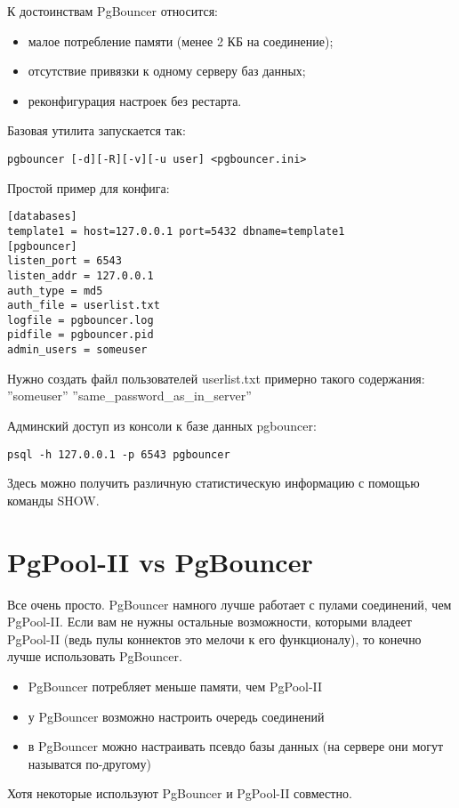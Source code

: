 К достоинствам PgBouncer относится:
\begin{itemize}
\item малое потребление памяти (менее 2 КБ на соединение);
\item отсутствие привязки к одному серверу баз данных;
\item реконфигурация настроек без рестарта.
\end{itemize}

Базовая утилита запускается так:
\begin{lstlisting}[label=lst:pgbouncer1,caption=PgBouncer]
pgbouncer [-d][-R][-v][-u user] <pgbouncer.ini>
\end{lstlisting}

Простой пример для конфига:
\begin{lstlisting}[label=lst:pgbouncer2,caption=PgBouncer]
[databases]
template1 = host=127.0.0.1 port=5432 dbname=template1
[pgbouncer]
listen_port = 6543
listen_addr = 127.0.0.1
auth_type = md5
auth_file = userlist.txt
logfile = pgbouncer.log
pidfile = pgbouncer.pid
admin_users = someuser
\end{lstlisting}

Нужно создать файл пользователей userlist.txt примерно такого содержания: ''someuser'' ''same\_password\_as\_in\_server''

Админский доступ из консоли к базе данных pgbouncer:
\begin{lstlisting}[label=lst:pgbouncer3,caption=PgBouncer]
psql -h 127.0.0.1 -p 6543 pgbouncer
\end{lstlisting}

Здесь можно получить различную статистическую информацию с помощью команды SHOW.

\section{PgPool-II vs PgBouncer}

Все очень просто. PgBouncer намного лучше работает с пулами соединений, чем PgPool-II. Если вам не
нужны остальные возможности, которыми владеет PgPool-II (ведь пулы коннектов это мелочи к его функционалу),
то конечно лучше использовать PgBouncer.
\begin{itemize}
\item PgBouncer потребляет меньше памяти, чем PgPool-II
\item у PgBouncer возможно настроить очередь соединений
\item в PgBouncer можно настраивать псевдо базы данных (на сервере они могут называтся по-другому)
\end{itemize}

Хотя некоторые используют PgBouncer и PgPool-II совместно.